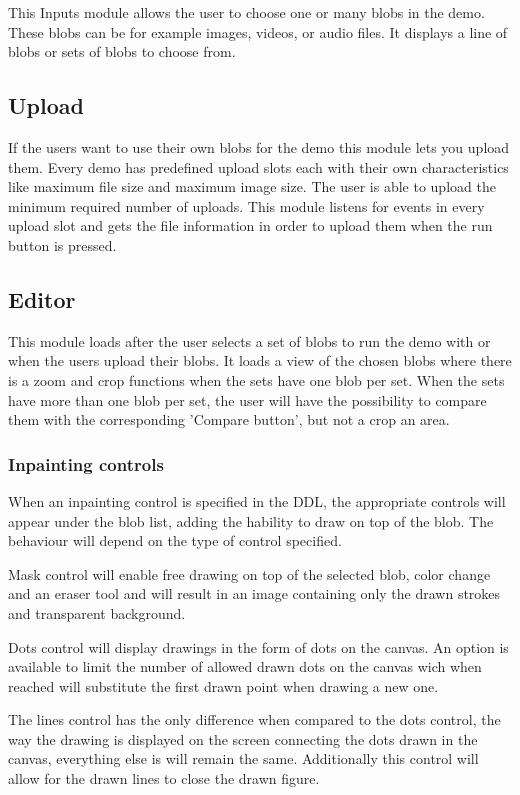 This Inputs module allows the user to choose one or many blobs in the demo. These blobs can be for example images, videos, or audio files. It displays a line of blobs or sets of blobs to choose from.


\subsection{Upload}
If the users want to use their own blobs for the demo this module lets you upload them. Every demo has predefined 
upload slots each with their own characteristics like maximum file size and maximum image size. The user is able to upload the 
minimum required number of uploads. This module listens for events in every upload slot and gets the file information in order to 
upload them when the run button is pressed.


\subsection{Editor}
This module loads after the user selects a set of blobs to run the demo with or when the users upload their blobs. It loads a view of
the chosen blobs where there is a zoom and crop functions when the sets have one blob per set. When the sets have more than 
one blob per set, the user will have the possibility to compare them with the corresponding 'Compare button', but not a crop 
an area.

\subsubsection{Inpainting controls}
When an inpainting control is specified in the DDL, the appropriate controls will appear under the blob list, adding the hability to draw on top of the blob. The behaviour will depend on the type of control specified. 

Mask control will enable free drawing on top of the selected blob, color change and an eraser tool and will result in an image containing only the drawn strokes and transparent background.

Dots control will display drawings in the form of dots on the canvas. An option is available to limit the number of allowed drawn dots on the canvas wich when reached will substitute the first drawn point when drawing a new one.

The lines control has the only difference when compared to the dots control,  the way the drawing is displayed on the screen connecting the dots drawn in the canvas, everything else is will remain the same. Additionally this control will allow for the drawn lines to close the drawn figure.

